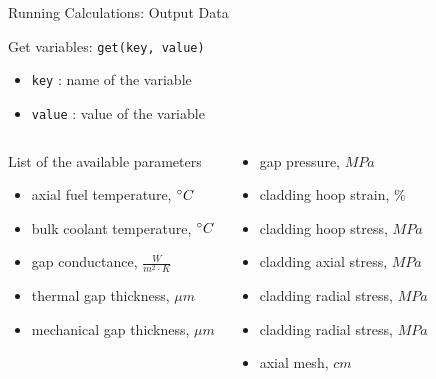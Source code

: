 \documentclass[11pt]{beamer}
\begin{document}
\begin{frame}{Running Calculations: Output Data}
  
  \footnotesize

  \begin{block}{Get variables: \texttt{get(key, value)}}
    \begin{itemize}
    \item \texttt{key} : name of the variable
    \item \texttt{value} : value of the variable    
    \end{itemize}
  \end{block}
  
  \begin{columns}
  \begin{block}{List of the available parameters}
    \begin{itemize}
    \item axial fuel temperature, $\degree C$
    \item bulk coolant temperature, $\degree C$
    \item gap conductance, $\frac{W}{m^2 \cdot K}$
    \item thermal gap thickness, $\mu m$
    \item mechanical gap thickness, $\mu m$
    \end{itemize}
  \end{block}

  \begin{block}{}
    \begin{itemize}
    \item gap pressure, $MPa$
    \item cladding hoop strain, $\%$
    \item cladding hoop stress, $MPa$
    \item cladding axial stress, $MPa$
    \item cladding radial stress, $MPa$
    \item cladding radial stress, $MPa$
    \item axial mesh, $cm$
    \end{itemize}
  \end{block}

  \end{columns}

\end{frame}
\end{document}
